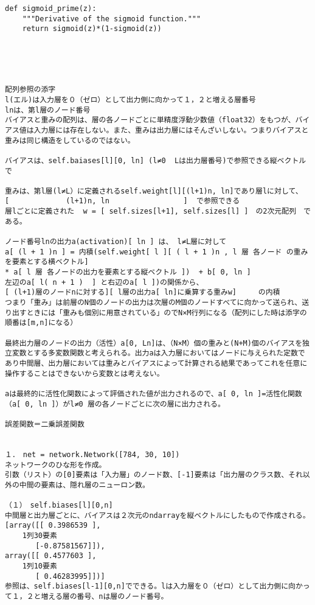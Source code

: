\documentclass[11pt,a4j,fleqn]{jarticle}
\begin{document}
\begin{verbatim}
def sigmoid_prime(z):
    """Derivative of the sigmoid function."""
    return sigmoid(z)*(1-sigmoid(z))





配列参照の添字
l(エル)は入力層を０（ゼロ）として出力側に向かって１，２と増える層番号
lnは、第l層のノード番号
バイアスと重みの配列は、層の各ノードごとに単精度浮動少数値（float32）をもつが、バイアス値は入力層には存在しない。また、重みは出力層にはそんざいしない。つまりバイアスと重みは同じ構造をしているのではない。

バイアスは、self.baiases[l][0, ln] (l≠0  Lは出力層番号)で参照できる縦ベクトルで

重みは、第l層(l≠L）に定義されるself.weight[l][(l+1)n, ln]であり層lに対して、
[             (l+1)n, ln                 ]  で参照できる　
層lごとに定義された  w = [ self.sizes[l+1], self.sizes[l] ]　の2次元配列　である。

ノード番号lnの出力a(activation)[ ln ] は、 l≠L層に対して
a[ (l + 1 )n ] = 内積(self.weight[ l ][ ( l + 1 )n , l 層 各ノード の重みを要素とする横ベクトル] 
* a[ l 層 各ノードの出力を要素とする縦ベクトル ])  + b[ 0, ln ]
左辺のa[ l( n + 1 )  ] と右辺のa[ l ])の関係から、
[ (l+1)層のノードnに対する][ l層の出力a[ ln]に乗算する重みw]     の内積
つまり「重み」は前層のN個のノードの出力は次層のM個のノードすべてに向かって送られ、送り出すときには「重みも個別に用意されている」のでN×M行列になる（配列にした時は添字の順番は[m,n]になる）

最終出力層のノードの出力（活性）a[0, Ln]は、（N×M）個の重みと(N+M)個のバイアスを独立変数とする多変数関数と考えられる。出力aは入力層においてはノードに与えられた定数であり中間層、出力層においては重みとバイアスによって計算される結果であってこれを任意に操作することはできないから変数とは考えない。

aは最終的に活性化関数によって評価された値が出力されるので、a[ 0, ln ]=活性化関数（a[ 0, ln ]）がl≠0 層の各ノードごとに次の層に出力される。

誤差関数＝二乗誤差関数


１．　net = network.Network([784, 30, 10])
ネットワークのひな形を作成。
引数（リスト）の[0]要素は「入力層」のノード数、[-1]要素は「出力層のクラス数、それ以外の中間の要素は、隠れ層のニューロン数。

（１）　self.biases[l][0,n]
中間層と出力層ごとに、バイアスは２次元のndarrayを縦ベクトルにしたもので作成される。
[array([[ 0.3986539 ],
	1列30要素
       [-0.87581567]]), 
array([[ 0.4577603 ],
	1列10要素
       [ 0.46283995]])]
参照は、self.biases[l-1][0,n]でできる。lは入力層を０（ゼロ）として出力側に向かって１，２と増える層の番号、nは層のノード番号。


\end{verbatim}
\end{document}
